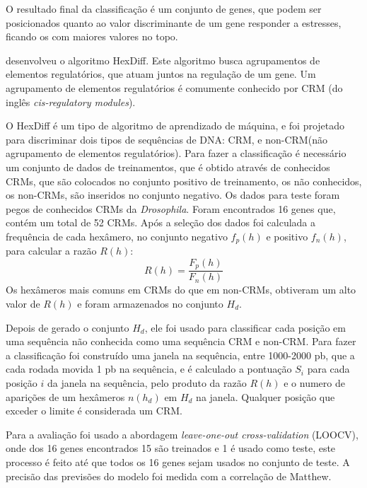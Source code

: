 O resultado final da classificação é um conjunto de genes, que podem ser posicionados quanto ao valor discriminante de um gene responder a estresses, ficando os com maiores valores no topo.


\cite{Chan2005} desenvolveu o algoritmo HexDiff. Este algoritmo busca agrupamentos de elementos regulatórios, que atuam juntos na regulação de um gene. Um agrupamento de elementos regulatórios é comumente conhecido por CRM (do inglês \textit{cis-regulatory modules}).

O HexDiff é um tipo de algoritmo de aprendizado de máquina, e foi projetado para discriminar dois tipos de sequências de DNA: CRM, e non-CRM(não agrupamento de elementos regulatórios). Para fazer a classificação é necessário um conjunto de dados de treinamentos, que é obtido através de conhecidos CRMs, que são colocados no conjunto positivo de treinamento, os não conhecidos, os non-CRMs, são inseridos no conjunto negativo. Os dados para teste foram pegos de conhecidos CRMs da  \textit{Drosophila}. Foram encontrados 16 genes que, contém um total de 52 CRMs. Após a seleção dos dados foi calculada a frequência de cada hexâmero, no conjunto negativo $f_{p}(h)$ e positivo $f_{n}(h)$, para calcular a razão $R(h)$:
\begin{equation}
R(h) = \frac{F_{p}(h)}{F_{n}(h)}
\end{equation}
Os hexâmeros mais comuns em CRMs do que em  non-CRMs, obtiveram um alto valor de $R(h)$ e foram armazenados no conjunto $H_{d}$. 

Depois de gerado o conjunto $H_{d}$, ele foi usado para classificar cada posição em uma sequência não conhecida como uma sequência CRM e non-CRM. Para fazer a classificação foi construído uma janela na sequência, entre 1000-2000 pb, que a cada rodada movida 1 pb na sequência, e é calculado a pontuação $S_{i}$ para cada posição $i$ da janela na sequência, pelo produto da razão $R(h)$ e o numero de aparições de um hexâmeros $n(h_{d})$ em $H_{d}$ na janela. Qualquer posição que exceder o limite é considerada um CRM.

Para a avaliação foi usado a abordagem  \textit{leave-one-out cross-validation} (LOOCV), onde dos 16 genes encontrados 15 são treinados e 1 é usado como teste, este processo é feito até que todos os 16 genes sejam usados no conjunto de teste. A precisão das previsões do modelo foi medida com a correlação de Matthew. 

